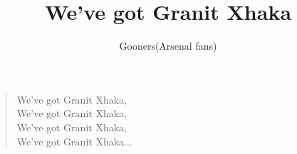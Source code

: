 \documentclass[a4paper,12pt]{article}
\title{We've got Granit Xhaka}
\author{Gooners(Arsenal fans)}
\date{}
\begin{document}
	
	\maketitle
	
	\begin{verse}
		
		We've got Granit Xhaka, \\
		We've got Granit Xhaka, \\
		We've got Granit Xhaka, \\
		We've got Granit Xhaka$\ldots$
		
	\end{verse}
	
\end{document}
